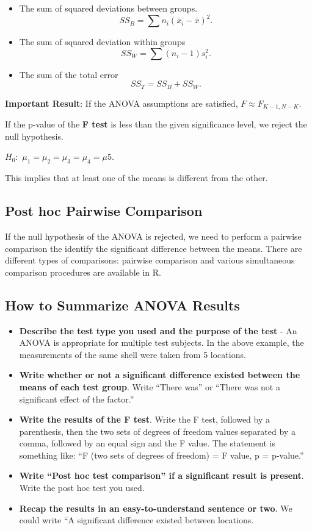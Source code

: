 \documentclass[
]{book}
\begin{document}
\begin{itemize}
\item
  The sum of squared deviations between groups.
  \[\displaystyle SS_{B} = \sum n_i(\bar{x}_i-\bar{x})^2.\]
\item
  The sum of squared deviation within groups
  \[\displaystyle SS_{W} = \sum (n_i-1)s_i^2.\]
\item
  The sum of the total error
  \[\displaystyle SS_T = SS_B + SS_W.\]
\end{itemize}

\textbf{Important Result}: If the ANOVA assumptions are satisfied, \(F \approx F_{K-1, N-K}\).

If the p-value of the \textbf{F test} is less than the given significance level, we reject the null hypothesis.

\(H_0:\) \(\mu_1 = \mu_2 = \mu_3 = \mu_4 = \mu5.\)

This implies that at least one of the means is different from the other.

\hypertarget{post-hoc-pairwise-comparison}{%
\subsection{Post hoc Pairwise Comparison}\label{post-hoc-pairwise-comparison}}

If the null hypothesis of the ANOVA is rejected, we need to perform a pairwise comparison the identify the significant difference between the means. There are different types of comparisons: pairwise comparison and various simultaneous comparison procedures are available in R.

\hypertarget{how-to-summarize-anova-results}{%
\subsection{How to Summarize ANOVA Results}\label{how-to-summarize-anova-results}}

\begin{itemize}
\item
  \textbf{Describe the test type you used and the purpose of the test} - An ANOVA is appropriate for multiple test subjects. In the above example, the measurements of the same shell were taken from 5 locations.
\item
  \textbf{Write whether or not a significant difference existed between the means of each test group}. Write ``There was'' or ``There was not a significant effect of the factor.''
\item
  \textbf{Write the results of the F test}. Write the F test, followed by a parenthesis, then the two sets of degrees of freedom values separated by a comma, followed by an equal sign and the F value. The statement is something like: ``F (two sets of degrees of freedom) = F value, p = p-value.''
\item
  \textbf{Write ``Post hoc test comparison'' if a significant result is present}. Write the post hoc test you used.
\item
  \textbf{Recap the results in an easy-to-understand sentence or two}. We could write ``A significant difference existed between locations.
\end{itemize}
\end{document}
